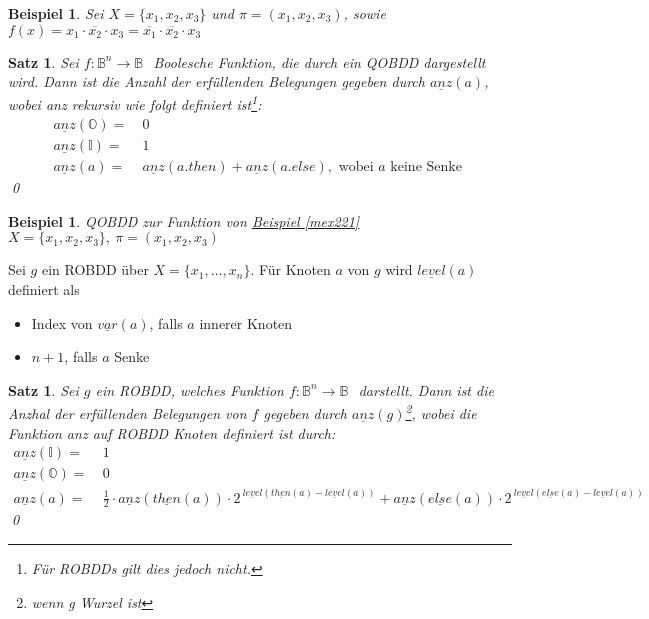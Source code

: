 \documentclass[ngerman]{scrartcl}
\theoremstyle{custom}
\newtheorem{mex}[mdef]{Beispiel}
\newtheorem{ms}[mdef]{Satz}
\newcommand{\0}{\mathbf{0}}
\newcommand{\1}{\mathbf{L}}
\newcommand{\bol}{\mathds{B}^n \rightarrow \mathds{B}}
\newcommand{\bolf}{$f: \bol~$}
\begin{document}
\begin{mex}
  Sei $X = \{x_1,x_2,x_3\}$ und $\pi = (x_1,x_2,x_3)$, sowie $f(x) =
  x_1 \cdot \overline{x_2} \cdot x_3 = \overline{x_1} \cdot
  \overline{x_2} \cdot x_3$
\end{mex}

\begin{ms}\label{sat:anz}
  Sei \bolf ~Boolesche Funktion, die durch ein QOBDD dargestellt
  wird. Dann ist die Anzahl der erf\"ullenden Belegungen gegeben durch
  $\underline{anz}(a)$, wobei anz rekursiv wie folgt definiert
  ist\footnote{F\"ur ROBDDs gilt dies jedoch nicht.}:
  \begin{align*}
    \underline{anz}(\mathds{O}) = & ~0\\
    \underline{anz}(\mathds{I}) = & ~1\\
    \underline{anz}(a) = & ~\underline{anz}(a.then) +
    \underline{anz}(a.else), \text{ wobei } a \text{ keine Senke }
  \end{align*}
\qed
\end{ms}

\begin{mex}
QOBDD zur Funktion von \hyperref[mex221]{Beispiel \ref{mex221}}\\
$X = \{x_1,x_2,x_3\}, ~\pi = (x_1,x_2,x_3)$
\end{mex}

Sei $g$ ein ROBDD \"uber $X = \{x_1, \dots, x_n\}$. F\"ur Knoten $a$
von $g$ wird $\underline{level}(a)$ definiert als 
\begin{itemize}
\item Index von $\underline{var}(a)$, falls $a$ innerer Knoten
\item $n+1$, falls $a$ Senke
\end{itemize}

\begin{ms}
  Sei $g$ ein ROBDD, welches Funktion \bolf ~darstellt. Dann ist die
  Anzhal der erf\"ullenden Belegungen von $f$ gegeben durch
  $\underline{anz}(g)$\footnote{wenn g Wurzel ist}, wobei die Funktion
  anz auf ROBDD Knoten definiert ist durch:
  \begin{align*}
    \underline{anz}(\mathds{I})=& ~1\\
    \underline{anz}(\mathds{O})=& ~0\\
    \underline{anz}(a) =& ~\frac{1}{2} \cdot
  \underline{anz}(\underline{then}(a)) \cdot
  2^{~\underline{level}(\underline{then}(a) - \underline{level}(a))} +
  \underline{anz}(\underline{else}(a)) \cdot
  2^{~\underline{level}(\underline{else}(a) - \underline{level}(a))}
  \end{align*}
\qed
\end{ms}
\end{document}
